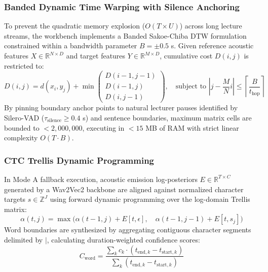 \documentclass[12pt,a4paper]{article}
\begin{document}
\subsubsection{Banded Dynamic Time Warping with Silence Anchoring}
To prevent the quadratic memory explosion ($O(T \times U)$) across long lecture streams, the workbench implements a Banded Sakoe-Chiba DTW formulation constrained within a bandwidth parameter $B = \pm 0.5$ s. Given reference acoustic features $X \in \mathbb{R}^{N \times D}$ and target features $Y \in \mathbb{R}^{M \times D}$, cumulative cost $D(i, j)$ is restricted to:
\begin{equation}
D(i, j) = d(x_i, y_j) + \min \begin{pmatrix} D(i-1, j-1) \\ D(i-1, j) \\ D(i, j-1) \end{pmatrix}, \quad \text{subject to } \left| j - \frac{M}{N} i \right| \le \left\lceil \frac{B}{t_{\text{hop}}} \right\rceil
\end{equation}
By pinning boundary anchor points to natural lecturer pauses identified by Silero-VAD ($\tau_{\text{silence}} \ge 0.4$ s) and sentence boundaries, maximum matrix cells are bounded to $<2,000,000$, executing in $<15$ MB of RAM with strict linear complexity $O(T \cdot B)$.

\subsubsection{CTC Trellis Dynamic Programming}
In Mode A fallback execution, acoustic emission log-posteriors $E \in \mathbb{R}^{T \times C}$ generated by a Wav2Vec2 backbone are aligned against normalized character targets $s \in \mathbb{Z}^J$ using forward dynamic programming over the log-domain Trellis matrix:
\begin{equation}
\alpha(t, j) = \max \Big( \alpha(t-1, j) + E[t, \epsilon], \quad \alpha(t-1, j-1) + E[t, s_j] \Big)
\end{equation}
Word boundaries are synthesized by aggregating contiguous character segments delimited by $|$, calculating duration-weighted confidence scores:
\begin{equation}
C_{\text{word}} = \frac{\sum_{k} c_k \cdot (t_{\text{end}, k} - t_{\text{start}, k})}{\sum_{k} (t_{\text{end}, k} - t_{\text{start}, k})}
\end{equation}
\end{document}
